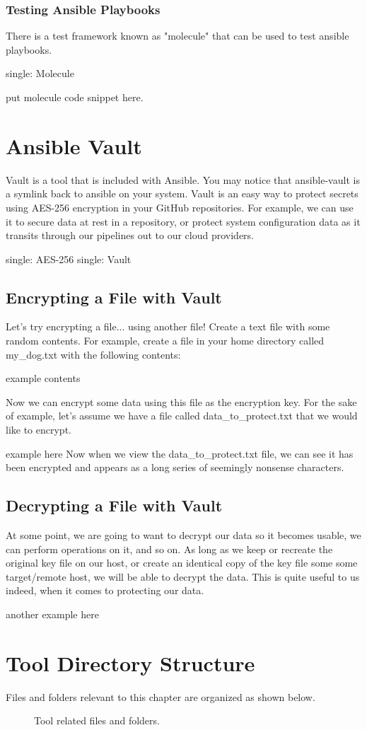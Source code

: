 \subsubsection{Testing Ansible Playbooks}
\justify
There is a test framework known as "molecule" that can be used to test
ansible playbooks.

single: Molecule

put molecule code snippet here.

\section{Ansible Vault}
\justify
Vault is a tool that is included with Ansible. You may notice that
ansible-vault is a symlink back to ansible on your system. Vault is an
easy way to protect secrets using AES-256 encryption in your GitHub
repositories. For example, we can use it to secure data at rest in a
repository, or protect system configuration data as it transits through
our pipelines out to our cloud providers.

single: AES-256 single: Vault

\subsection{Encrypting a File with Vault}

\justify
Let's try encrypting a file... using another file! Create a text file
with some random contents. For example, create a file in your home
directory called my\_dog.txt with the following contents:

example contents

\justify
Now we can encrypt some data using this file as the encryption key. For
the sake of example, let's assume we have a file called
data\_to\_protect.txt that we would like to encrypt.

example here
\justify
Now when we view the data\_to\_protect.txt file, we can see it has been
encrypted and appears as a long series of seemingly nonsense characters.

\subsection{Decrypting a File with Vault}
\justify
At some point, we are going to want to decrypt our data so it becomes
usable, we can perform operations on it, and so on. As long as we keep
or recreate the original key file on our host, or create an identical
copy of the key file some some target/remote host, we will be able to
decrypt the data. This is quite useful to us indeed, when it comes to
protecting our data.

another example here

\clearpage

\section{Tool Directory Structure}
\justify
Files and folders relevant to this chapter are organized as shown below.

\begin{figure}[!htb]
	
	\caption{Tool related files and folders.}
\end{figure}
